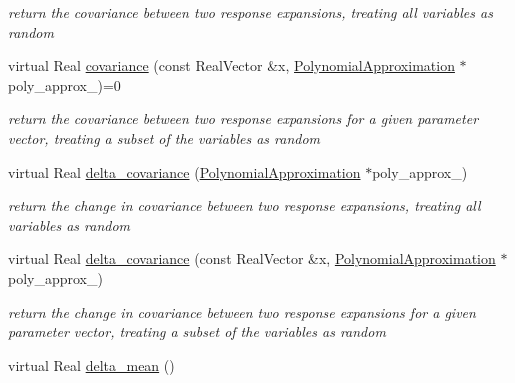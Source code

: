 \begin{DoxyCompactItemize}
\begin{DoxyCompactList}\small\item\em return the covariance between two response expansions, treating all variables as random \end{DoxyCompactList}\item 
virtual Real \hyperlink{classPecos_1_1PolynomialApproximation_ac510eafe010d3ae6b6d4d4c296ae3f8b}{covariance} (const Real\+Vector \&x, \hyperlink{classPecos_1_1PolynomialApproximation}{Polynomial\+Approximation} $\ast$poly\+\_\+approx\+\_)=0\label{classPecos_1_1PolynomialApproximation_ac510eafe010d3ae6b6d4d4c296ae3f8b}

\begin{DoxyCompactList}\small\item\em return the covariance between two response expansions for a given parameter vector, treating a subset of the variables as random \end{DoxyCompactList}\item 
virtual Real \hyperlink{classPecos_1_1PolynomialApproximation_ae3f6a8d87917102636d171f5c86a2fb5}{delta\+\_\+covariance} (\hyperlink{classPecos_1_1PolynomialApproximation}{Polynomial\+Approximation} $\ast$poly\+\_\+approx\+\_)\label{classPecos_1_1PolynomialApproximation_ae3f6a8d87917102636d171f5c86a2fb5}

\begin{DoxyCompactList}\small\item\em return the change in covariance between two response expansions, treating all variables as random \end{DoxyCompactList}\item 
virtual Real \hyperlink{classPecos_1_1PolynomialApproximation_a5a89afe07fb520282fa35dfc9ca2b0a1}{delta\+\_\+covariance} (const Real\+Vector \&x, \hyperlink{classPecos_1_1PolynomialApproximation}{Polynomial\+Approximation} $\ast$poly\+\_\+approx\+\_)\label{classPecos_1_1PolynomialApproximation_a5a89afe07fb520282fa35dfc9ca2b0a1}

\begin{DoxyCompactList}\small\item\em return the change in covariance between two response expansions for a given parameter vector, treating a subset of the variables as random \end{DoxyCompactList}\item 
virtual Real \hyperlink{classPecos_1_1PolynomialApproximation_aa276ec09d706b03780f9bc01af40514e}{delta\+\_\+mean} ()\label{classPecos_1_1PolynomialApproximation_aa276ec09d706b03780f9bc01af40514e}


\end{DoxyCompactItemize}
